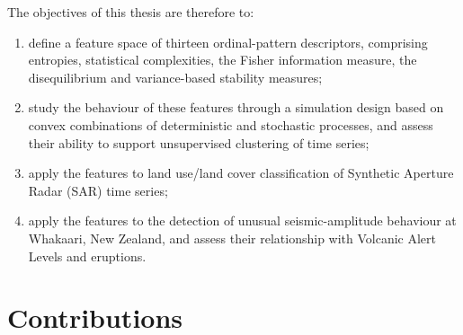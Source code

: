 The objectives of this thesis are therefore to:
\begin{enumerate}
	\item define a feature space of thirteen ordinal-pattern descriptors, comprising entropies, statistical complexities, the Fisher information measure, the disequilibrium and variance-based stability measures;
	\item study the behaviour of these features through a simulation design based on convex combinations of deterministic and stochastic processes, and assess their ability to support unsupervised clustering of time series;
	\item apply the features to land use/land cover classification of Synthetic Aperture Radar (SAR) time series;
	\item apply the features to the detection of unusual seismic-amplitude behaviour at Whakaari, New Zealand, and assess their relationship with Volcanic Alert Levels and eruptions.
\end{enumerate}

\section{Contributions}\label{S:intro:contrib}

